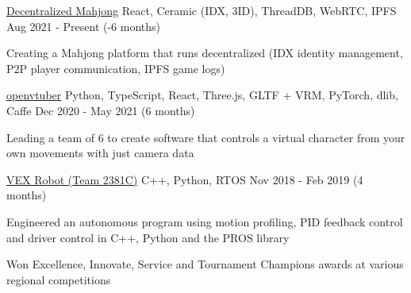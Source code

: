 \begin{cventries}
	\cventry
	{\href{https://github.com/fensandemajiang/fensandemajiang}{Decentralized Mahjong}}
	{React, Ceramic (IDX, 3ID), ThreadDB, WebRTC, IPFS}
	{}
	{Aug 2021 - Present  (-6 months)}
	{
		\begin{cvitems}
			\item{Creating a Mahjong platform that runs decentralized (IDX identity management, P2P player communication, IPFS game logs)}
		\end{cvitems}
	}
	\cventry
	{\href{https://github.com/virtuber/openvtuber}{openvtuber}}
	{Python, TypeScript, React, Three.js, GLTF + VRM, PyTorch, dlib, Caffe}
	{}
	{Dec 2020 - May 2021 (6 months)}
	{
		\begin{cvitems}
			\item{Leading a team of 6 to create software that controls a virtual character from your own movements with just camera data}
		\end{cvitems}
	}
	\cventry
	{\href{https://gitlab.com/2381-robotics/2381C-V2}{VEX Robot (Team 2381C)}}
	{C++, Python, RTOS}
	{}
	{Nov 2018 - Feb 2019 (4 months)}
	{
		\begin{cvitems}
			\item{Engineered an autonomous program using motion profiling, PID feedback control and driver control in C++, Python and the PROS library}
			\item{Won Excellence, Innovate, Service and Tournament Champions awards at various regional competitions}
		\end{cvitems}
	}
\end{cventries}
